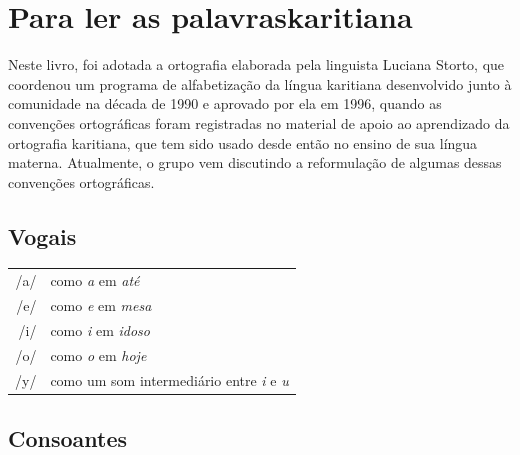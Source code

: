 \chapter[Para ler as palavras karitiana]{Para ler as palavras\break karitiana}

Neste livro, foi adotada a ortografia elaborada pela linguista Luciana Storto, que coordenou um programa de alfabetização da língua karitiana desenvolvido junto à comunidade na década de 1990 e aprovado por ela em 1996, quando as convenções ortográficas foram registradas no material de apoio ao aprendizado da ortografia karitiana, que tem sido usado desde então no ensino de sua língua materna. Atualmente, o grupo vem discutindo a reformulação de algumas dessas convenções ortográficas.

\section{Vogais}

\begingroup
\begin{tabular}{rl}
/a/ & como \textit{a} em \textit{até}\\
/e/ & como \textit{e} em \textit{mesa}\\
/i/ & como \textit{i} em \textit{idoso}\\
/o/ & como \textit{o} em \textit{hoje}\\
/y/ & como um som intermediário entre \textit{i} e \textit{u}\protect\footnotemark\\
\end{tabular}

\endgroup

\section{Consoantes}

